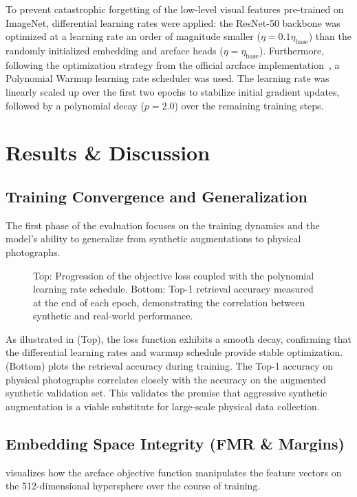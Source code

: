 To prevent catastrophic forgetting of the low-level visual features pre-trained on ImageNet, differential learning rates were applied: the \ac{ResNet}-50 backbone was optimized at a learning rate an order of magnitude smaller ($\eta = 0.1 \eta_{\text{base}}$) than the randomly initialized embedding and \ac{arcface} heads ($\eta = \eta_{\text{base}}$). Furthermore, following the optimization strategy from the official \ac{arcface} implementation~\cite{deng2022arcface}, a Polynomial Warmup learning rate scheduler was used. The learning rate was linearly scaled up over the first two epochs to stabilize initial gradient updates, followed by a polynomial decay ($p=2.0$) over the remaining training steps.

\section{Results \& Discussion}
\subsection{Training Convergence and Generalization}\label{subsec:exp_convergence}
The first phase of the evaluation focuses on the training dynamics and the model's ability to generalize from synthetic augmentations to physical photographs. 

\begin{figure}[H]
    \raggedright
    
    \caption{Top: Progression of the objective loss coupled with the polynomial learning rate schedule. Bottom: Top-1 retrieval accuracy measured at the end of each epoch, demonstrating the correlation between synthetic and real-world performance.}
    \label{fig:training_convergence}
\end{figure}

As illustrated in  (Top), the loss function exhibits a smooth decay, confirming that the differential learning rates and warmup schedule provide stable optimization.  (Bottom) plots the retrieval accuracy during training. The Top-1 accuracy on physical photographs correlates closely with the accuracy on the augmented synthetic validation set. This validates the premise that aggressive synthetic augmentation is a viable substitute for large-scale physical data collection.

\subsection{Embedding Space Integrity (\acs{FMR} \& Margins)}\label{subsec:exp_metric_learning}
 visualizes how the \ac{arcface} objective function manipulates the feature vectors on the 512-dimensional hypersphere over the course of training.

